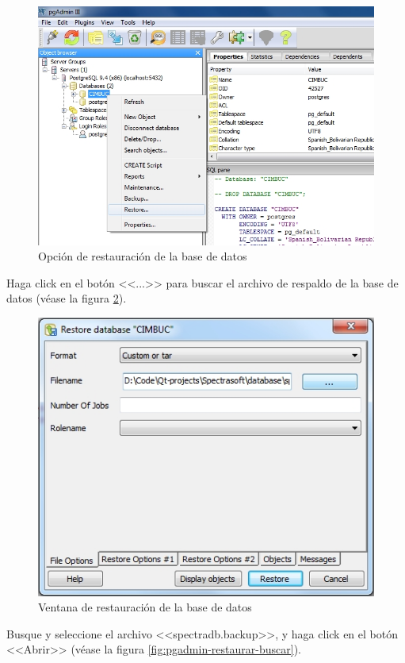 \begin{figure}[H]
  \centering
  \includegraphics[width=1\linewidth]{./img/pgadmin-restaurar.jpg}
\caption[Opci\'{o}n de restauraci\'{o}n de la base de datos]{Opci\'{o}n de restauraci\'{o}n de la base de datos\label{fig:pgadmin-restaurar}}
\end{figure}

\newpage

Haga click en el bot\'{o}n <<...>> para buscar el archivo de respaldo de la base de datos (v\'{e}ase la figura \ref{fig:pgadmin-restaurar-ventana}).

\begin{figure}[H]
  \centering
  \includegraphics[width=.6\linewidth]{./img/pgadmin-restaurar-ventana.jpg}
\caption[Ventana de restauraci\'{o}n de la base de datos]{Ventana de restauraci\'{o}n de la base de datos\label{fig:pgadmin-restaurar-ventana}}
\end{figure}

Busque y seleccione el archivo <<spectradb.backup>>, y haga click en el bot\'{o}n <<Abrir>> (v\'{e}ase la figura \ref{fig:pgadmin-restaurar-buscar}).

